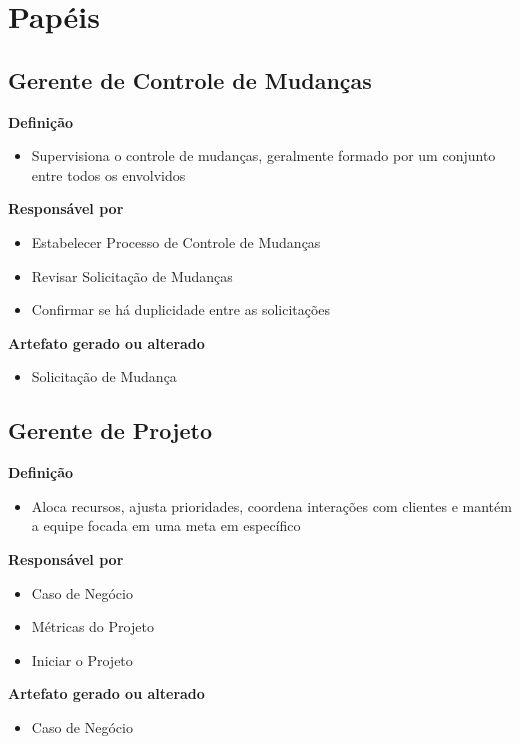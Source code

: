 \section{Papéis}

\subsection{Gerente de Controle de Mudanças}

\textbf{Definição}
\begin{itemize}
\item Supervisiona o controle de mudanças, geralmente formado por um conjunto entre todos os envolvidos
\end{itemize}

\textbf{Responsável por}
\begin{itemize}
\item Estabelecer Processo de Controle de Mudanças
\item Revisar Solicitação de Mudanças
\item Confirmar se há duplicidade entre as solicitações
\end{itemize}

\textbf{Artefato gerado ou alterado}
\begin{itemize}
\item Solicitação de Mudança
\end{itemize}

\subsection{Gerente de Projeto}

\textbf{Definição}
\begin{itemize}
\item Aloca recursos, ajusta prioridades, coordena interações com clientes e mantém a equipe focada em uma meta em específico
\end{itemize}

\textbf{Responsável por}
\begin{itemize}
\item Caso de Negócio
\item Métricas do Projeto
\item Iniciar o Projeto
\end{itemize}

\textbf{Artefato gerado ou alterado}
\begin{itemize}
\item Caso de Negócio
\end{itemize}

